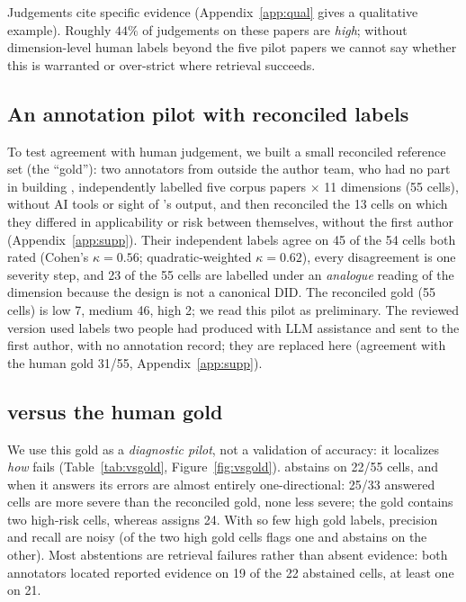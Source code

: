 Judgements cite specific evidence
(Appendix~\ref{app:qual} gives a qualitative example). Roughly $44\%$ of
judgements on these papers are \emph{high}; without dimension-level
human labels beyond the five pilot papers we cannot say whether this is warranted or over-strict where
retrieval succeeds.

\subsection{An annotation pilot with reconciled labels}
\label{sec:gold}

To test agreement with human judgement, we built a small reconciled reference
set (the ``gold''): two annotators from outside the author team, who had no
part in building \sys{}, independently labelled five corpus papers $\times$ 11
dimensions (55 cells), without AI tools or sight of \sys{}'s output, and then reconciled the 13 cells on which they differed in
applicability or risk between themselves, without the first author
(Appendix~\ref{app:supp}). Their
independent labels agree on 45 of the 54
cells both rated (Cohen's $\kappa=0.56$; quadratic-weighted $\kappa=0.62$),
every disagreement is one severity step, and 23 of the 55 cells are labelled
under an \emph{analogue} reading of the dimension because the design is not a
canonical DID. The reconciled gold (55 cells) is low 7, medium 46, high 2; we
read this pilot as preliminary. The reviewed version
used labels two people had produced with LLM assistance and sent to the first
author, with no annotation record; they are replaced here (agreement with the
human gold 31/55, Appendix~\ref{app:supp}).

\subsection{\sys{} versus the human gold}
\label{sec:vsgold}

We use this gold as a \emph{diagnostic pilot}, not a validation of accuracy:
it localizes \emph{how} \sys{} fails
(Table~\ref{tab:vsgold}, Figure~\ref{fig:vsgold}). \sys{} abstains on 22/55
cells, and when it answers its errors are almost entirely one-directional:
25/33 answered cells are more severe than the reconciled gold, none less
severe; the gold contains two high-risk cells, whereas \sys{} assigns 24. With so few high
gold labels, precision and recall are noisy (of the two high gold cells \sys{}
flags one and abstains on the other). Most
abstentions are retrieval failures rather than absent evidence: both annotators
located reported evidence on 19 of the 22 abstained cells, at least one on 21.

